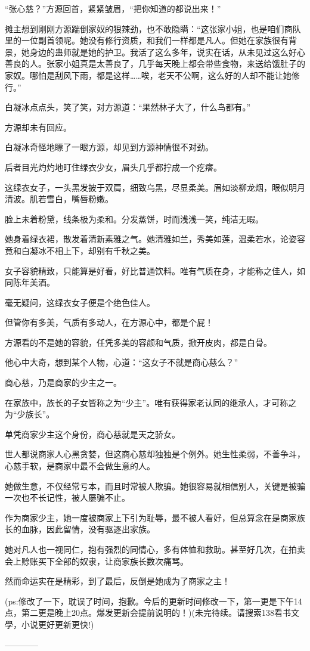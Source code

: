 \begin{this_body}
“张心慈？”方源回首，紧紧皱眉，“把你知道的都说出来！”

摊主想到刚刚方源踹倒家奴的狠辣劲，也不敢隐瞒：“这张家小姐，也是咱们商队里的一位副首领呢。她没有修行资质，和我们一样都是凡人。但她在家族很有背景，她身边的蛊师就是她的护卫。我活了这么多年，说实在话，从未见过这么好心善良的人。张家小姐真是太善良了，几乎每天晚上都会带些食物，来送给饿肚子的家奴。哪怕是刮风下雨，都是这样……唉，老天不公啊，这么好的人却不能让她修行。”

白凝冰点点头，笑了笑，对方源道：“果然林子大了，什么鸟都有。”

方源却未有回应。

白凝冰奇怪地瞟了一眼方源，却见到方源神情很不对劲。

后者目光灼灼地盯住绿衣少女，眉头几乎都拧成一个疙瘩。

这绿衣女子，一头黑发披于双肩，细致乌黑，尽显柔美。眉如淡柳龙烟，眼似明月清波。肌若雪白，嘴唇粉嫩。

脸上未着粉黛，线条极为柔和。分发蒸饼，时而浅浅一笑，纯洁无暇。

她身着绿衣裙，散发着清新素雅之气。她清雅如兰，秀美如莲，温柔若水，论姿容竟和白凝冰不相上下，却别有千秋之美。

女子容貌精致，只能算是好看，好比普通饮料。唯有气质在身，才能称之佳人，如同陈年美酒。

毫无疑问，这绿衣女子便是个绝色佳人。

但管你有多美，气质有多动人，在方源心中，都是个屁！

方源看的不是她的容貌，任凭多美的容颜和气质，掀开皮肉，都是白骨。

他心中大奇，想到某个人物，心道：“这女子不就是商心慈么？”

商心慈，乃是商家的少主之一。

在家族中，族长的子女皆称之为“少主”。唯有获得家老认同的继承人，才可称之为“少族长”。

单凭商家少主这个身份，商心慈就是天之骄女。

世人都说商家人心黑贪婪，但这商心慈却独独是个例外。她生性柔弱，不善争斗，心慈手软，是商家中最不会做生意的人。

她做生意，不仅经常亏本，而且时常被人欺骗。她很容易就相信别人，关键是被骗一次也不长记性，被人屡骗不止。

作为商家少主，她一度被商家上下引为耻辱，最不被人看好，但总算念在是商家族长的血脉，因此留情，没有驱逐出家族。

她对凡人也一视同仁，抱有强烈的同情心，多有体恤和救助。甚至好几次，在拍卖会上赊账买下全部的奴隶，让商家族长数次痛骂。

然而命运实在是精彩，到了最后，反倒是她成为了商家之主！

(ps:修改了一下，耽误了时间，抱歉。今后的更新时间修改一下，第一更是下午14点，第二更是晚上20点。爆发更新会提前说明的！)(未完待续。请搜索138看书文學，小说更好更新更快!)

------------

\end{this_body}


